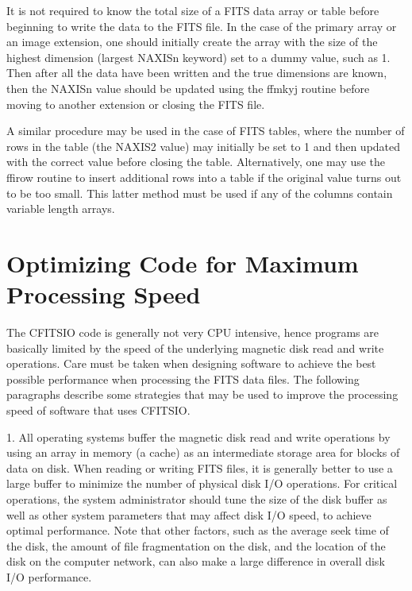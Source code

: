 It is not required to know the total size of a FITS data array or table
before beginning to write the data to the FITS file.  In the case of
the primary array or an image extension, one should initially create
the array with the size of the highest dimension (largest NAXISn
keyword) set to a dummy value, such as 1.  Then after all the data have
been written and the true dimensions are known, then the NAXISn value
should be updated using the ffmkyj routine before moving to another
extension or closing the FITS file.

A similar procedure may be used in the case of FITS tables, where the
number of rows in the table (the NAXIS2 value) may initially be set to
1 and then updated with the correct value before closing the table.
Alternatively, one may use the ffirow routine to insert additional rows
into a table if the original value turns out to be too small.  This
latter method must be used if any of the columns contain variable
length arrays.


\section{Optimizing Code for Maximum Processing Speed}

The CFITSIO code is generally not very CPU intensive, hence programs are
basically limited by the speed of the underlying magnetic disk read and
write operations.  Care must be taken when designing software to achieve
the best possible performance when processing the FITS data files. The
following paragraphs describe some strategies that may be used to
improve the processing speed of software that uses CFITSIO.

1.  All operating systems buffer the magnetic disk read and write
operations by using an array in memory (a cache) as an intermediate
storage area for blocks of data on disk.  When reading or writing FITS
files, it is generally better to use a large buffer to minimize the
number of physical disk I/O operations.  For critical operations, the
system administrator should tune the size of the disk buffer as well as
other system parameters that may affect disk I/O speed, to achieve
optimal performance.  Note that other factors, such as the average seek
time of the disk, the amount of file fragmentation on the disk, and the
location of the disk on the computer network, can also make a large
difference in overall disk I/O performance.

